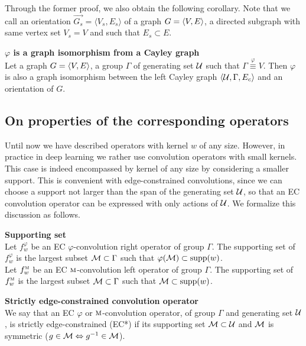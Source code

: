 Through the former proof, we also obtain the following corollary. Note that we call an orientation $\vec{G_s} = \langle V_s, E_s \rangle$ of a graph $G = \langle V, E \rangle$, a directed subgraph with same vertex set $V_s = V$ and such that $E_s \subset E$.

\begin{corollary}\textbf{$\varphi$ is a graph isomorphism from a Cayley graph}\\
Let a graph $G = \langle V, E \rangle$, a group $\Gamma$ of generating set $\mathcal{U}$ such that $\Gamma \overset\varphi\equiv V$. Then $\varphi$ is also a graph isomorphism between the left Cayley graph $\langle \mathcal{U}, \Gamma, E_c \rangle$ and an orientation of $G$.
\label{cor:giso}
\end{corollary}

\subsection{On properties of the corresponding operators}
\label{sec:ec}

Until now we have described operators with kernel $w$ of any size. However, in practice in deep learning we rather use convolution operators with small kernels. This case is indeed encompassed by kernel of any size by considering a smaller support. This is convenient with edge-constrained convolutions, since we can choose a support not larger than the span of the generating set $\mathcal{U}$, so that an EC convolution operator can be expressed with only actions of $\mathcal{U}$.
We formalize this discussion as follows.

\begin{definition}\textbf{Supporting set}\\
Let $f_w^\varphi$ be an EC $\varphi$-convolution right operator of group $\Gamma$. The supporting set of $f_w^\varphi$ is the largest subset $\mathcal{M} \subset \Gamma$ such that $\varphi(\mathcal{M}) \subset \operatorname{supp}(w)$.\\
Let $f_w^{\operatorname{\textsc{m}}}$ be an EC $\operatorname{\textsc{m}}$-convolution left operator of group $\Gamma$. The supporting set of $f_w^{\operatorname{\textsc{m}}}$ is the largest subset $\mathcal{M} \subset \Gamma$ such that $\mathcal{M} \subset \operatorname{supp}(w)$.
\end{definition}

\begin{definition}\textbf{Strictly edge-constrained convolution operator}\\
We say that an EC $\varphi$ or $\operatorname{\textsc{m}}$-convolution operator, of group $\Gamma$ and generating set $\mathcal{U}$, is strictly edge-constrained (EC*) if its supporting set $\mathcal{M} \subset \mathcal{U}$ and $\mathcal{M}$ is symmetric (\ie $g \in \mathcal{M} \Leftrightarrow g^{-1} \in \mathcal{M}$).
\label{def:ecc}
\end{definition}

